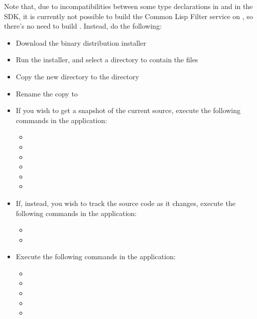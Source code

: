 \tertiaryEnd
{}
Note that, due to incompatibilities between some type declarations in \textbf{\ECL} and in
the \win{} SDK, it is currently not possible to build the Common Lisp Filter service on
\win, so there's no need to build \textbf{\ECL}.
Instead, do the following:
\begin{itemize}
\item Download the
{\win{} binary distribution installer}
\item\exSp{}Run the installer, and select a directory to contain the \ECL{} files
\item\exSp{}Copy the new directory to the directory
\item\exSp{}Rename the copy to 
\end{itemize}
\tertiaryEnd
{}
\begin{itemize}
\item If you wish to get a snapshot of the current source, execute the following
commands in the  application:
\begin{itemize}
\item {}
\item\exSp{}
\item\exSp{}
\item\exSp{}
\item\exSp{}
\item\exSp{}
\end{itemize}
\item\exSp{}If, instead, you wish to track the source code as it changes, execute the
following commands in the  application:
\begin{itemize}
\item {}
\item\exSp{}
\end{itemize}
\item\exSp{}Execute the following commands in the  application:
\begin{itemize}
\item\exSp{}
\item\exSp{}
\item\exSp{}
\item\exSp{}
\item\exSp{}
\end{itemize}
\end{itemize}
